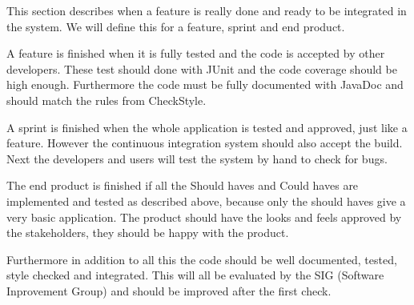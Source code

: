 This section describes when a feature is really done and ready to be integrated in the system. We will define this for a feature, sprint and end product.

A feature is finished when it is fully tested and the code is accepted by other developers.
These test should done with JUnit and the code coverage should be high enough.
Furthermore the code must be fully documented with JavaDoc and should match the rules from CheckStyle.

A sprint is finished when the whole application is tested and approved, just like a feature. However the continuous integration system should also accept the build. Next the developers and users will test the system by hand to check for bugs.

The end product is finished if all the Should haves and Could haves are implemented and tested as described above, because only the should haves give a very basic application. The product should have the looks and feels approved by the stakeholders, they should be happy with the product.

Furthermore in addition to all this the code should be well documented, tested, style checked and integrated. This will all be evaluated by the SIG (Software Inprovement Group) and should be improved after the first check.